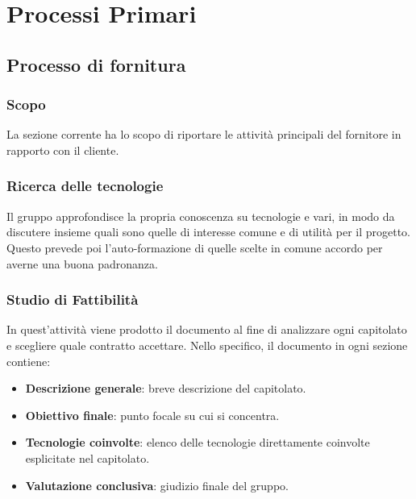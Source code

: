\section{Processi Primari}\label{PP}

    \subsection{Processo di fornitura}\label{PP:Fornitura}	%

        \subsubsection{Scopo}\label{PP:Fornitura:Scopo}
		La sezione corrente ha lo scopo di riportare le  attività principali del fornitore in rapporto con il cliente.

		\subsubsection{Ricerca delle tecnologie}
		Il gruppo approfondisce la propria conoscenza su tecnologie e  vari, in modo da discutere insieme quali sono
		quelle di interesse comune e di utilità per il progetto. Questo prevede poi l'auto-formazione di quelle scelte in comune accordo per averne una buona padronanza.

        \subsubsection{Studio di Fattibilità}\label{PP:Fornitura:SdF}
        In quest'attività viene prodotto il documento \Doc{\SdFv} al fine di analizzare ogni capitolato e scegliere quale contratto accettare.
        Nello specifico, il documento in ogni sezione contiene:
        	\begin{itemize}
        		\item \textbf{Descrizione generale}: breve descrizione del capitolato.
        		\item \textbf{Obiettivo finale}: punto focale su cui si concentra.
        		\item \textbf{Tecnologie coinvolte}: elenco delle tecnologie direttamente coinvolte esplicitate nel capitolato.
        		\item \textbf{Valutazione conclusiva}: giudizio finale del gruppo.
        	\end{itemize}

